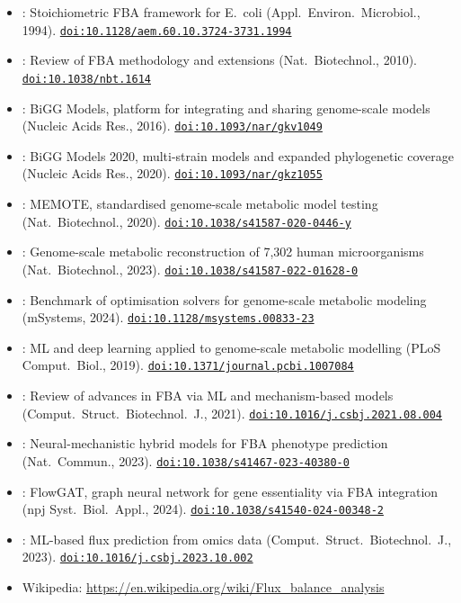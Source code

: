 \documentclass[11pt]{article}
\newcommand{\doi}[1]{\href{https://doi.org/#1}{\texttt{doi:#1}}}
\begin{document}
\begin{itemize}[noitemsep]
  \item \cite{VarmaPalsson1994}: Stoichiometric FBA framework for E.~coli 
    (Appl.\ Environ.\ Microbiol., 1994). \doi{10.1128/aem.60.10.3724-3731.1994}
  \item \cite{Orth2010}: Review of FBA methodology and extensions 
    (Nat.\ Biotechnol., 2010). \doi{10.1038/nbt.1614}
  \item \cite{BiGG2016}: BiGG Models, platform for integrating and sharing genome-scale
    models (Nucleic Acids Res., 2016). \doi{10.1093/nar/gkv1049}
  \item \cite{BiGG2020}: BiGG Models 2020, multi-strain models and expanded phylogenetic
    coverage (Nucleic Acids Res., 2020). \doi{10.1093/nar/gkz1055}
  \item \cite{MEMOTE2020}: MEMOTE, standardised genome-scale metabolic model testing
    (Nat.\ Biotechnol., 2020). \doi{10.1038/s41587-020-0446-y}
  \item \cite{Heinken2023}: Genome-scale metabolic reconstruction of 7{,}302 human
    microorganisms (Nat.\ Biotechnol., 2023). \doi{10.1038/s41587-022-01628-0}
  \item \cite{Machado2024}: Benchmark of optimisation solvers for genome-scale metabolic
    modeling (mSystems, 2024). \doi{10.1128/msystems.00833-23}
  \item \cite{Zampieri2019}: ML and deep learning applied to genome-scale metabolic 
    modelling (PLoS Comput.\ Biol., 2019). \doi{10.1371/journal.pcbi.1007084}
  \item \cite{Sahu2021}: Review of advances in FBA via ML and mechanism-based models 
    (Comput.\ Struct.\ Biotechnol.\ J., 2021). \doi{10.1016/j.csbj.2021.08.004}
  \item \cite{Millard2023}: Neural-mechanistic hybrid models for FBA phenotype 
    prediction (Nat.\ Commun., 2023). \doi{10.1038/s41467-023-40380-0}
  \item \cite{FlowGAT2024}: FlowGAT, graph neural network for gene essentiality 
    via FBA integration (npj Syst.\ Biol.\ Appl., 2024). \doi{10.1038/s41540-024-00348-2}
  \item \cite{GonzalezFlux2023}: ML-based flux prediction from omics data 
    (Comput.\ Struct.\ Biotechnol.\ J., 2023). \doi{10.1016/j.csbj.2023.10.002}
  \item Wikipedia: \url{https://en.wikipedia.org/wiki/Flux_balance_analysis}
\end{itemize}
\end{document}
